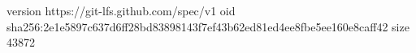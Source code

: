 version https://git-lfs.github.com/spec/v1
oid sha256:2e1e5897c637d6ff28bd83898143f7ef43b62ed81ed4ee8fbe5ee160e8caff42
size 43872

